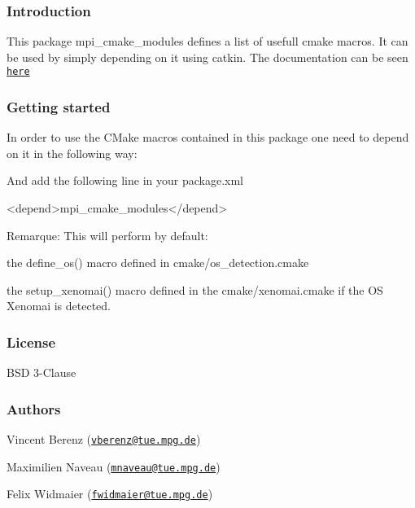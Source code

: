 \subsubsection*{Introduction}

This package {\ttfamily mpi\+\_\+cmake\+\_\+modules} defines a list of usefull cmake macros. It can be used by simply depending on it using catkin. The documentation can be seen \href{https://machines-in-motion.github.io/}{\tt here}

\subsubsection*{Getting started}

In order to use the C\+Make macros contained in this package one need to depend on it in the following way\+: 


And add the following line in your {\ttfamily package.\+xml}


\begin{DoxyCode}
<\textcolor{keywordtype}{depend}>\textcolor{keyword}{mpi\_cmake\_modules}</\textcolor{keywordtype}{depend}>
\end{DoxyCode}


Remarque\+: This will perform by default\+:
\begin{DoxyItemize}
\item the {\ttfamily define\+\_\+os()} macro defined in cmake/os\+\_\+detection.\+cmake
\item the {\ttfamily setup\+\_\+xenomai()} macro defined in the cmake/xenomai.\+cmake if the OS Xenomai is detected.
\end{DoxyItemize}

\subsubsection*{License}

B\+SD 3-\/\+Clause

\subsubsection*{Authors}


\begin{DoxyItemize}
\item Vincent Berenz (\href{mailto:vberenz@tue.mpg.de}{\tt vberenz@tue.\+mpg.\+de})
\item Maximilien Naveau (\href{mailto:mnaveau@tue.mpg.de}{\tt mnaveau@tue.\+mpg.\+de})
\item Felix Widmaier (\href{mailto:fwidmaier@tue.mpg.de}{\tt fwidmaier@tue.\+mpg.\+de}) 
\end{DoxyItemize}